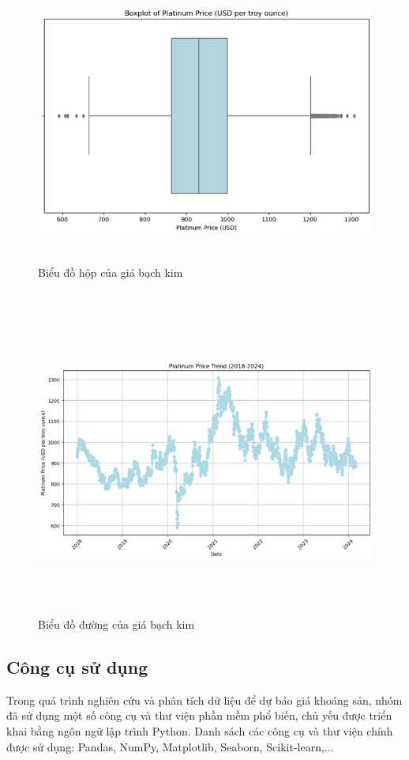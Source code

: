 \documentclass[conference]{IEEEtran}
\begin{document}
\begin{figure}[H]
    \centering
    \begin{minipage}{0.23\textwidth}
    \centering
    \includegraphics[width=1\textwidth]{bibliography/Figure/boxplot_pt.png}
    \caption{Biểu đồ hộp của giá bạch kim}
    \label{fig:5}
    \end{minipage}
    \hfill
    \begin{minipage}{0.23\textwidth}
    \centering
    \includegraphics[width=1\textwidth]{bibliography/Figure/line_pt.png}
    \caption{Biểu đồ đường của giá bạch kim}
    \label{fig:6}
    \end{minipage}
\end{figure}




\subsection{Công cụ sử dụng}
Trong quá trình nghiên cứu và phân tích dữ liệu để dự báo giá khoáng sản, nhóm đã sử dụng một số công cụ và thư viện phần mềm phổ biến, chủ yếu được triển khai bằng ngôn ngữ lập trình Python. Danh sách các công cụ và thư viện chính được sử dụng: Pandas, NumPy, Matplotlib, Seaborn, Scikit-learn,... 
\end{document}
